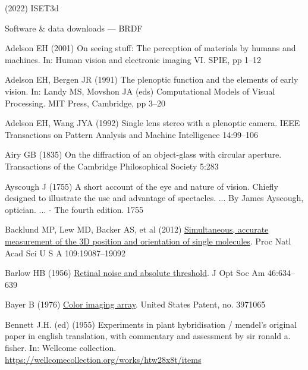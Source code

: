 \documentclass[
  letterpaper,
]{book}
\newlength{\cslhangindent}
\newenvironment{CSLReferences}[2] %
 {\begin{list}{}{%
  \setlength{\itemindent}{0pt}
  \setlength{\leftmargin}{0pt}
  \setlength{\parsep}{0pt}
  \ifodd #1
   \setlength{\leftmargin}{\cslhangindent}
   \setlength{\itemindent}{-1\cslhangindent}
  \fi
  \setlength{\itemsep}{#2\baselineskip}}}
 {\end{list}}
\begin{document}
\label{refs}
\begin{CSLReferences}{1}{1}
(2022) {ISET3d}

Software \& data downloads --- {BRDF}

Adelson EH (2001) On seeing stuff: {The} perception of materials by
humans and machines. In: Human vision and electronic imaging {VI}. SPIE,
pp 1--12

Adelson EH, Bergen JR (1991) The plenoptic function and the elements of
early vision. In: Landy MS, Movshon JA (eds) Computational {Models} of
{Visual Processing}. MIT Press, Cambridge, pp 3--20

Adelson EH, Wang JYA (1992) Single lens stereo with a plenoptic camera.
IEEE Transactions on Pattern Analysis and Machine Intelligence
14:99--106

Airy GB (1835) On the diffraction of an object-glass with circular
aperture. Transactions of the Cambridge Philosophical Society 5:283

Ayscough J (1755) {A short account of the eye and nature of vision.
Chiefly designed to illustrate the use and advantage of spectacles. ...
By James Ayscough, optician. ... - The fourth edition. 1755}

Backlund MP, Lew MD, Backer AS, et al (2012)
\href{http://dx.doi.org/10.1073/pnas.1216687109}{Simultaneous, accurate
measurement of the {3D} position and orientation of single molecules}.
Proc Natl Acad Sci U S A 109:19087--19092

Barlow HB (1956) \href{http://dx.doi.org/10.1364/JOSA.46.000634}{Retinal
noise and absolute threshold}. J Opt Soc Am 46:634--639

Bayer B (1976)
\href{https://cir.nii.ac.jp/crid/1572261550680217344}{Color imaging
array}. United States Patent, no. 3971065

Bennett J.H. (ed) (1955) Experiments in plant hybridisation / mendel's
original paper in english translation, with commentary and assessment by
sir ronald a. fisher. In: Wellcome collection.
\url{https://wellcomecollection.org/works/htw28x8t/items}


\end{CSLReferences}
\end{document}
